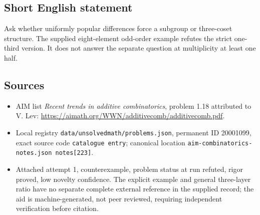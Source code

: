 \documentclass[11pt]{article}
\begin{document}
\subsection{Short English statement}
Ask whether uniformly popular differences force a subgroup or three-coset structure. The supplied eight-element odd-order example refutes the strict one-third version. It does not answer the separate question at multiplicity at least one half.
\subsection{Sources}
\begin{itemize}
\item AIM list \emph{Recent trends in additive combinatorics}, problem 1.18 attributed to V. Lev: \url{https://aimath.org/WWN/additivecomb/additivecomb.pdf}.
\item Local registry \texttt{data/unsolvedmath/problems.json}, permanent ID 20001099, exact source code \texttt{catalogue entry}; canonical location \texttt{aim-combinatorics-notes.json notes[223]}.
\item Attached attempt 1, counterexample, problem status at run refuted, rigor proved, low novelty confidence. The explicit example and general three-layer ratio have no separate complete external reference in the supplied record; the aid is machine-generated, not peer reviewed, requiring independent verification before citation.
\end{itemize}
\end{document}

